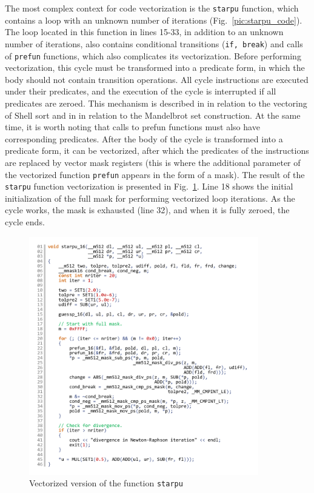 \documentclass[utf8,english]{psta}%
\begin{document}
The most complex context for code vectorization is the \texttt{starpu} function, which contains a loop with an unknown number of iterations (Fig.~\ref{pic:starpu_code}).
The loop located in this function in lines 15-33, in addition to an unknown number of iterations, also contains conditional transitions (\texttt{if, break}) and calls of \texttt{prefun} functions, which also complicates its vectorization.
Before performing vectorization, this cycle must be transformed into a predicate form, in which the body should not contain transition operations.
All cycle instructions are executed under their predicates, and the execution of the cycle is interrupted if all predicates are zeroed.
This mechanism is described in \cite{RybTelShabLoopsVect} in relation to the vectoring of Shell sort and in \cite{Krzikalla} in relation to the Mandelbrot set construction.
At the same time, it is worth noting that calls to prefun functions must also have corresponding predicates.
After the body of the cycle is transformed into a predicate form, it can be vectorized, after which the predicates of the instructions are replaced by vector mask registers (this is where the additional parameter of the vectorized function \texttt{prefun} appears in the form of a mask).
The result of the \texttt{starpu} function vectorization is presented in Fig.~\ref{pic:starpu_16_code}.
Line 18 shows the initial initialization of the full mask for performing vectorized loop iterations. As the cycle works, the mask is exhausted (line 32), and when it is fully zeroed, the cycle ends.

\begin{figure}
\includegraphics[width=10cm]{pics/pic_starpu_16_code}
\caption{Vectorized version of the function \texttt{starpu}}
\label{pic:starpu_16_code}
\end{figure}
\end{document}

